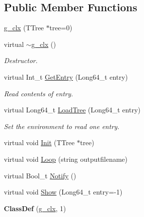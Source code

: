 \subsection*{Public Member Functions}
\begin{DoxyCompactItemize}
\item 
\hyperlink{classg__clx_aa619daf508fe1d6bddb000af26630f31}{g\+\_\+clx} (T\+Tree $\ast$tree=0)
\item 
\mbox{\label{classg__clx_adbe899d82aba9fc16ec17f47c0ce894e}} 
virtual \hyperlink{classg__clx_adbe899d82aba9fc16ec17f47c0ce894e}{$\sim$g\+\_\+clx} ()
\begin{DoxyCompactList}\small\item\em Destructor. \end{DoxyCompactList}\item 
\mbox{\label{classg__clx_ab4c53e12e70c3671ff8895fc388dd7d2}} 
virtual Int\+\_\+t \hyperlink{classg__clx_ab4c53e12e70c3671ff8895fc388dd7d2}{Get\+Entry} (Long64\+\_\+t entry)
\begin{DoxyCompactList}\small\item\em Read contents of entry. \end{DoxyCompactList}\item 
\mbox{\label{classg__clx_a0aab3745bdb3db08757c974eebffbe39}} 
virtual Long64\+\_\+t \hyperlink{classg__clx_a0aab3745bdb3db08757c974eebffbe39}{Load\+Tree} (Long64\+\_\+t entry)
\begin{DoxyCompactList}\small\item\em Set the environment to read one entry. \end{DoxyCompactList}\item 
virtual void \hyperlink{classg__clx_a92531261155ea15bee6b74c7e491132a}{Init} (T\+Tree $\ast$tree)
\item 
virtual void \hyperlink{classg__clx_a9d5de859df4bfbb746726661ff1d24a9}{Loop} (string outputfilename)
\item 
virtual Bool\+\_\+t \hyperlink{classg__clx_a1fe81316168bc18dc2325ca5595577a9}{Notify} ()
\item 
virtual void \hyperlink{classg__clx_ae86183470c7bb8db45753aa4c86f1d41}{Show} (Long64\+\_\+t entry=-\/1)
\item 
\mbox{\label{classg__clx_a8d0a8ed3a7cc55ca97aeb77f4183d3b8}} 
{\bfseries Class\+Def} (\hyperlink{classg__clx}{g\+\_\+clx}, 1)

\end{DoxyCompactItemize}
